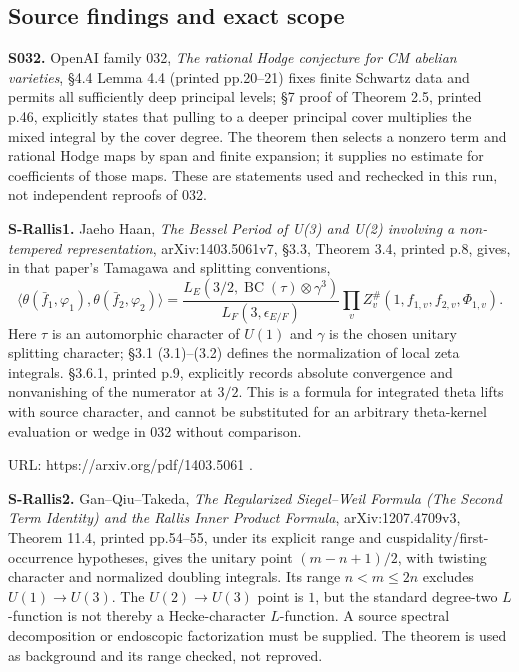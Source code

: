 \subsection{Source findings and exact scope}\label{source-findings-and-exact-scope}

\textbf{S032.} OpenAI family 032, \emph{The rational Hodge conjecture for CM abelian varieties}, §4.4 Lemma 4.4 (printed pp.20--21) fixes finite Schwartz data and permits all sufficiently deep principal levels; §7 proof of Theorem 2.5, printed p.46, explicitly states that pulling to a deeper principal cover multiplies the mixed integral by the cover degree. The theorem then selects a nonzero term and rational Hodge maps by span and finite expansion; it supplies no estimate for coefficients of those maps. These are statements used and rechecked in this run, not independent reproofs of 032.

\textbf{S-Rallis1.} Jaeho Haan, \emph{The Bessel Period of U(3) and U(2) involving a non-tempered representation}, arXiv:1403.5061v7, §3.3, Theorem 3.4, printed p.8, gives, in that paper's Tamagawa and splitting conventions, \[
\langle\theta(\bar f_1,\varphi_1),\theta(\bar f_2,\varphi_2)\rangle
 = \frac{L_E(3/2,\operatorname{BC}(\tau)\otimes\gamma^3)}{L_F(3,\epsilon_{E/F})}
 \prod_v Z_v^{\#}(1,f_{1,v},f_{2,v},\Phi_{1,v}).
\] Here \(\tau\) is an automorphic character of \(U(1)\) and \(\gamma\) is the chosen unitary splitting character; §3.1 (3.1)--(3.2) defines the normalization of local zeta integrals. §3.6.1, printed p.9, explicitly records absolute convergence and nonvanishing of the numerator at \(3/2\). This is a formula for integrated theta lifts with source character, and cannot be substituted for an arbitrary theta-kernel evaluation or wedge in 032 without comparison.

URL: https://arxiv.org/pdf/1403.5061 .

\textbf{S-Rallis2.} Gan--Qiu--Takeda, \emph{The Regularized Siegel--Weil Formula (The Second Term Identity) and the Rallis Inner Product Formula}, arXiv:1207.4709v3, Theorem 11.4, printed pp.54--55, under its explicit range and cuspidality/first-occurrence hypotheses, gives the unitary point \((m-n+1)/2\), with twisting character and normalized doubling integrals. Its range \(n<m\leq2n\) excludes \(U(1)\to U(3)\). The \(U(2)\to U(3)\) point is \(1\), but the standard degree-two \(L\)-function is not thereby a Hecke-character \(L\)-function. A source spectral decomposition or endoscopic factorization must be supplied. The theorem is used as background and its range checked, not reproved.

